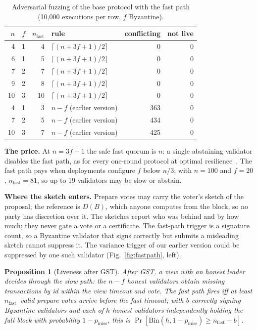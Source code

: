 \documentclass[journal]{IEEEtran}
\newtheorem{proposition}{Proposition}
\newcommand{\nf}{\ensuremath{n_{\mathrm{fast}}}}
\begin{document}
\begin{table}[t]
\caption{Adversarial fuzzing of the base protocol with the fast path
(10,000 executions per row, $f$ Byzantine).}
\label{tab:fuzz}
\centering
\footnotesize
\begin{tabular}{@{}rrrlrr@{}}
\toprule
$n$ & $f$ & \nf & rule & conflicting & not live\\
\midrule
4 & 1 & 4 & $\lceil (n+3f+1)/2 \rceil$ & 0 & 0\\
6 & 1 & 5 & $\lceil (n+3f+1)/2 \rceil$ & 0 & 0\\
7 & 2 & 7 & $\lceil (n+3f+1)/2 \rceil$ & 0 & 0\\
9 & 2 & 8 & $\lceil (n+3f+1)/2 \rceil$ & 0 & 0\\
10 & 3 & 10 & $\lceil (n+3f+1)/2 \rceil$ & 0 & 0\\
\midrule
4 & 1 & 3 & $n - f$ (earlier version) & 363 & 0\\
7 & 2 & 5 & $n - f$ (earlier version) & 434 & 0\\
10 & 3 & 7 & $n - f$ (earlier version) & 425 & 0\\
\bottomrule
\end{tabular}
\end{table}

\textbf{The price.} At $n = 3f + 1$ the safe fast quorum is $n$: a single
abstaining validator disables the fast path, as for every one-round
protocol at optimal resilience~\cite{kuznetsov2021fast}. The fast path
pays when deployments configure $f$ below $n/3$; with $n = 100$ and
$f = 20$, $\nf = 81$, so up to 19 validators may be slow or abstain.

\textbf{Where the sketch enters.} Prepare votes may carry the voter's
sketch of the proposal; the reference is $D(B)$, which anyone computes
from the block, so no party has discretion over it. The sketches report
who was behind and by how much; they never gate a vote or a certificate.
The fast-path trigger is a signature count, so a Byzantine validator that
signs correctly but submits a misleading sketch cannot suppress it.
The variance trigger of our earlier version could be suppressed by one
such validator (Fig.~\ref{fig:fastpath}, left).

\begin{proposition}[Liveness after GST]
\label{prop:liveness}
After GST, a view with an honest leader decides through the slow path:
the $n - f$ honest validators obtain missing transactions by id within
the view timeout and vote. The fast path fires iff at least \nf\ valid
prepare votes arrive before the fast timeout; with $b$ correctly signing
Byzantine validators and each of $h$ honest validators independently
holding the full block with probability $1 - p_{\mathrm{miss}}$, this is
$\Pr[\mathrm{Bin}(h, 1 - p_{\mathrm{miss}}) \ge \nf - b]$.
\end{proposition}
\end{document}
